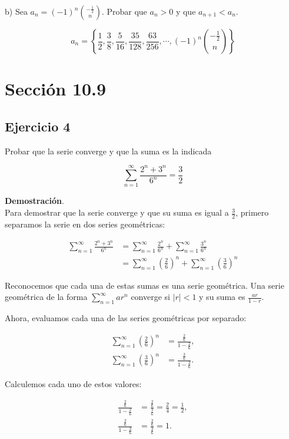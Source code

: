 \documentclass{article}
\begin{document}
    b) Sea $a_{n}=(-1)^{n}\binom{-\frac{1}{2}}{n}$. Probar que $a_{n}>0$ y que $a_{n+1}<a_{n}$.

    $$
    a_{n}=\left\{\frac{1}{2}, \frac{3}{8}, \frac{5}{16}, \frac{35}{128}, \frac{63}{256}, \cdots,(-1)^{n}\binom{-\frac{1}{2}}{n}\right\}
    $$

    \section*{Sección 10.9}
    \subsection*{Ejercicio 4}

    Probar que la serie converge y que la suma es la indicada

    $$
    \sum_{n=1}^{\infty} \frac{2^{n}+3^{n}}{6^{n}}=\frac{3}{2}
    $$

    \textbf{Demostración}.\\
    Para demostrar que la serie converge y que su suma es igual a $\frac{3}{2}$, primero separamos la serie en dos series geométricas:

    \begin{align*}
    \sum_{n=1}^{\infty} \frac{2^{n}+3^{n}}{6^{n}} &=\sum_{n=1}^{\infty} \frac{2^{n}}{6^{n}} + \sum_{n=1}^{\infty} \frac{3^{n}}{6^{n}} \\
    &=\sum_{n=1}^{\infty} \left(\frac{2}{6}\right)^{n} + \sum_{n=1}^{\infty} \left(\frac{3}{6}\right)^{n}
    \end{align*}

    Reconocemos que cada una de estas sumas es una serie geométrica. Una serie geométrica de la forma $\sum_{n=1}^{\infty} ar^n$ converge si $|r| < 1$ y su suma es $\frac{ar}{1-r}$.

    Ahora, evaluamos cada una de las series geométricas por separado:

    \begin{align*}
    \sum_{n=1}^{\infty} \left(\frac{2}{6}\right)^{n} &= \frac{\frac{2}{6}}{1-\frac{2}{6}}, \\
    \sum_{n=1}^{\infty} \left(\frac{3}{6}\right)^{n} &= \frac{\frac{3}{6}}{1-\frac{3}{6}}.
    \end{align*}

    Calculemos cada uno de estos valores:

    \begin{align*}
    \frac{\frac{2}{6}}{1-\frac{2}{6}} &= \frac{\frac{2}{6}}{\frac{4}{6}} = \frac{2}{4} = \frac{1}{2},\\
    \frac{\frac{3}{6}}{1-\frac{3}{6}} &= \frac{\frac{3}{6}}{\frac{3}{6}} = 1.
    \end{align*}
\end{document}
